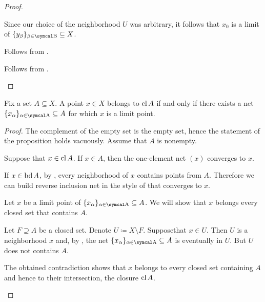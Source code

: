 \begin{proposition}
\begin{proof}
\begin{description}
\begin{description}
      Since our choice of the neighborhood \( U \) was arbitrary, it follows that \( x_0 \) is a limit of \( \{ y_\beta \}_{\beta \in \CB} \subseteq X \).

      \ImpliedBy Follows from .
    \end{description}


    Follows from .
  \end{description}
\end{proof}

\begin{proposition}\label{thm:limit_point_iff_in_closure}\cite[proposition 1.6.3]{Engelking1989}
  Fix a set \( A \subseteq X \). A point \( x \in X \) belongs to \( \operatorname{cl}{A} \) if and only if there exists a net \( \{ x_\al \}_{\al \in \CA} \subseteq A \) for which \( x \) is a limit point.
\end{proposition}
\begin{proof}
  The complement of the empty set is the empty set, hence the statement of the proposition holds vacuously. Assume that \( A \) is nonempty.

  \begin{description}
    \Implies Suppose that \( x \in \operatorname{cl}{A} \). If \( x \in A \), then the one-element net \( (x) \) converges to \( x \).

    If \( x \in \operatorname{bd}{A} \), by , every neighborhood of \( x \) contains points from \( A \). Therefore we can build reverse inclusion net in the style of  that converges to \( x \).

    \ImpliedBy Let \( x \) be a limit point of \( \{ x_\al \}_{\al \in \CA} \subseteq A \). We will show that \( x \) belongs every closed set that contains \( A \).

    Let \( F \supseteq A \) be a closed set. Denote \( U \coloneqq X \setminus F \). Suppose\LEM that \( x \in U \). Then \( U \) is a neighborhood \( x \) and, by , the net \( \{ x_\al \}_{\al \in \CA} \subseteq A \) is eventually in \( U \). But \( U \) does not contains \( A \).

    The obtained contradiction shows that \( x \) belongs to every closed set containing \( A \) and hence to their intersection, the closure \( \operatorname{cl} A \).
  \end{description}
\end{proof}


\end{proposition}
